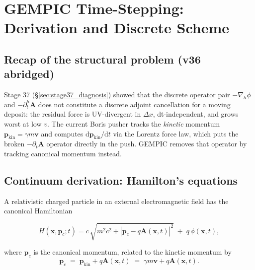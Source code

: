 \documentclass[11pt,a4paper]{article}
\newcommand{\vv}[1]{\mathbf{#1}}
\newcommand{\dd}{\mathrm{d}}
\begin{document}
\newpage

\section{GEMPIC Time-Stepping: Derivation and Discrete Scheme}
\label{sec:gempic_derivation}

\subsection{Recap of the structural problem (v36 abridged)}

Stage 37 (\S\ref{sec:stage37_diagnosis}) showed that the discrete
operator pair $-\nabla_h\phi$ and $-\partial^h_t\vv{A}$ does not
constitute a discrete adjoint cancellation for a moving deposit:
the residual force is UV-divergent in $\Delta x$, dt-independent,
and grows worst at low $v$.  The current Boris pusher tracks the
\emph{kinetic} momentum $\vv{p}_{\mathrm{kin}} = \gamma m \vv{v}$
and computes $\dd \vv{p}_{\mathrm{kin}}/\dd t$ via the Lorentz
force law, which puts the broken $-\partial_t\vv{A}$ operator
directly in the push.  GEMPIC removes that operator by tracking
canonical momentum instead.

\subsection{Continuum derivation: Hamilton's equations}

A relativistic charged particle in an external electromagnetic
field has the canonical Hamiltonian
\begin{eqbox}
\begin{equation}
\label{eq:gempic_H}
H(\vv{x}, \vv{p}_c; t)
   = c\,\sqrt{m^2 c^2 + |\vv{p}_c - q\vv{A}(\vv{x}, t)|^2}
   \;+\; q\,\phi(\vv{x}, t),
\end{equation}
\end{eqbox}
where $\vv{p}_c$ is the canonical momentum, related to the
kinetic momentum by
\begin{equation}
\label{eq:gempic_pc_pkin}
\vv{p}_c \;=\; \vv{p}_{\mathrm{kin}} + q\vv{A}(\vv{x}, t)
       \;=\; \gamma m \vv{v} + q\vv{A}(\vv{x}, t).
\end{equation}
\end{document}
